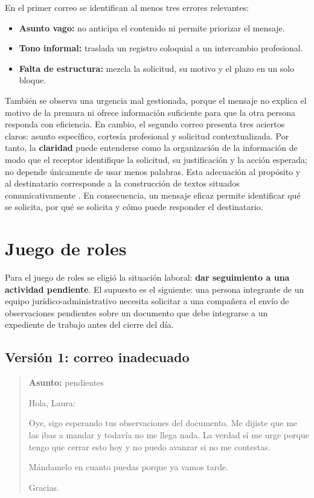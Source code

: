 \documentclass[
	spanish,
	letterpaper, oneside
]{article}
\begin{document}
	En el primer correo se identifican al menos tres errores relevantes:

\begin{itemize}
  \item \textbf{Asunto vago:} no anticipa el contenido ni permite priorizar el mensaje.
  \item \textbf{Tono informal:} traslada un registro coloquial a un intercambio profesional.
  \item \textbf{Falta de estructura:} mezcla la solicitud, su motivo y el plazo en un solo bloque.
\end{itemize}

	También se observa una urgencia mal gestionada, porque el mensaje no explica el motivo de la premura ni ofrece información suficiente para que la otra persona responda con eficiencia. En cambio, el segundo correo presenta tres aciertos claros: asunto específico, cortesía profesional y solicitud contextualizada. Por tanto, la \textbf{claridad} puede entenderse como la organización de la información de modo que el receptor identifique la solicitud, su justificación y la acción esperada; no depende únicamente de usar menos palabras. Esta adecuación al propósito y al destinatario corresponde a la construcción de textos situados comunicativamente \citep{ayalaTallerLecturaRedaccion2010,nunezcortesEscrituraAcademicaTeoria2015,vitoriaEscrituraAcademicaFormacion2019}. En consecuencia, un mensaje eficaz permite identificar qué se solicita, por qué se solicita y cómo puede responder el destinatario.

\section{Juego de roles}

Para el juego de roles se eligió la situación laboral: \textbf{dar seguimiento a una actividad pendiente}. El supuesto es el siguiente: una persona integrante de un equipo jurídico-administrativo necesita solicitar a una compañera el envío de observaciones pendientes sobre un documento que debe integrarse a un expediente de trabajo antes del cierre del día.

\subsection{Versión 1: correo inadecuado}

\begin{quote}
\textbf{Asunto:} pendientes

Hola, Laura:

Oye, sigo esperando tus observaciones del documento. Me dijiste que me las ibas a mandar y todavía no me llega nada. La verdad sí me urge porque tengo que cerrar esto hoy y no puedo avanzar si no me contestas.

Mándamelo en cuanto puedas porque ya vamos tarde.

Gracias.
\end{quote}
\end{document}
